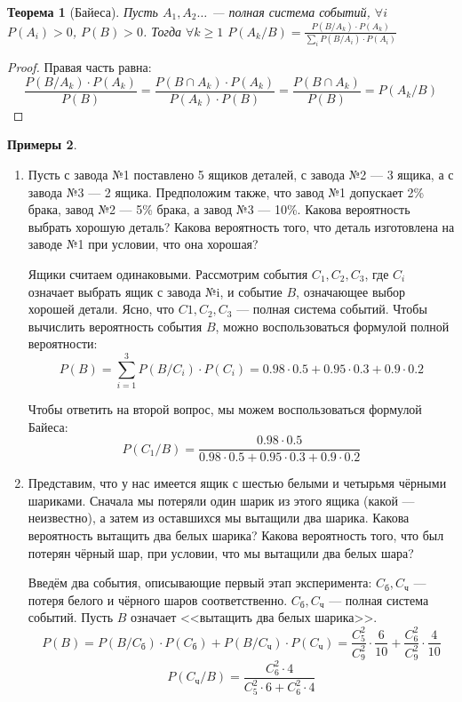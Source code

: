 \documentclass[11pt,openany,a4paper]{scrartcl}
\theoremstyle{plain}
\newtheorem{theorem}{Теорема}[subsection]
\theoremstyle{definition}
\newtheorem{examples}[theorem]{Примеры}
\begin{document}
\begin{theorem}[Байеса]
    Пусть $A_1, A_2 \ldots$ — полная система событий, $\forall i$ $P(A_i) > 0$, 
    $P(B) > 0$. Тогда $\forall k \geqslant 1$ $P(A_k/B) =
    \frac{P(B/A_k) \cdot P(A_k)}{\sum\limits_i P(B/A_i) \cdot P(A_i)}$
\end{theorem}
\begin{proof}
    Правая часть равна:
    $$
    \frac{P(B/A_k) \cdot P(A_k)}{P(B)} =
    \frac{P(B \cap A_k) \cdot P(A_k)}{P(A_k) \cdot P(B)} =
    \frac{P(B \cap A_k)}{P(B)} = P(A_k/B)
    $$
\end{proof}
\begin{examples}
    \begin{enumerate}
        \item Пусть с завода №1 поставлено 5 ящиков деталей, с завода №2 — 3 ящика,
        а с завода №3 — 2 ящика. Предположим также, что завод №1 допускает 2\% брака,
        завод №2 — 5\% брака, а завод №3 — 10\%. Какова вероятность выбрать хорошую
        деталь? Какова вероятность того, что деталь изготовлена на заводе №1 при
        условии, что она хорошая?
        
        Ящики считаем одинаковыми. Рассмотрим события $C_1, C_2, C_3$, где $C_i$
        означает выбрать ящик с завода №i, и событие $B$, означающее выбор хорошей 
        детали. Ясно, что $C1, C_2, C_3$ — полная система событий. Чтобы вычислить 
        вероятность события $B$, можно воспользоваться формулой полной вероятности:
        $$
        P(B) = \sum_{i = 1}^3 P(B/C_i) \cdot P(C_i) = 
        0.98 \cdot 0.5 + 0.95 \cdot 0.3 + 0.9 \cdot 0.2
        $$
        
        Чтобы ответить на второй вопрос, мы можем воспользоваться формулой Байеса:
        $$
        P(C_1/B) = \frac{0.98 \cdot 0.5}
        {0.98 \cdot 0.5 + 0.95 \cdot 0.3 + 0.9 \cdot 0.2}
        $$
        
        \item Представим, что у нас имеется ящик с шестью белыми и четырьмя чёрными 
        шариками. Сначала мы потеряли один шарик из этого ящика (какой — неизвестно),
        а затем из оставшихся мы вытащили два шарика. Какова вероятность вытащить
        два белых шарика? Какова вероятность того, что был потерян чёрный шар, при
        условии, что мы вытащили два белых шара?
        
        Введём два события, описывающие первый этап эксперимента: $C_{б}, C_{ч}$ — потеря
        белого и чёрного шаров соответственно. $C_{б}, C_{ч}$ — полная система событий.
        Пусть $B$ означает <<вытащить два белых шарика>>.
        $$
        P(B) = P(B/C_{б}) \cdot P(C_{б}) + P(B/C_{ч}) \cdot P(C_{ч}) =
        \frac{C_5^2}{C_9^2} \cdot \frac{6}{10} + \frac{C_6^2}{C_9^2} \cdot \frac{4}{10}
        $$
        $$
        P(C_{ч}/B) = \frac{C_6^2 \cdot 4}{C_5^2 \cdot 6 + C_6^2 \cdot 4}
        $$
    \end{enumerate}
\end{examples}
\end{document}
